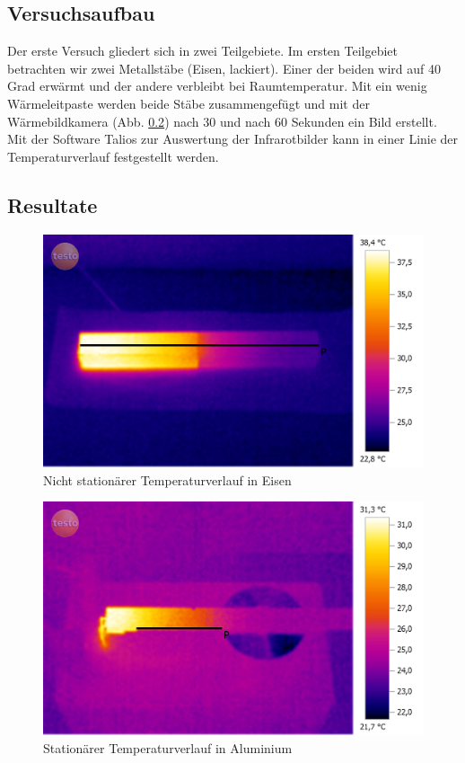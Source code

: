 \documentclass[12pt,a4paper]{article}
\begin{document}
\begin{multicols}{2}
\subsection{Versuchsaufbau}
Der erste Versuch gliedert sich in zwei Teilgebiete. Im ersten Teilgebiet betrachten wir zwei Metallstäbe (Eisen, lackiert). Einer der beiden wird auf 40 Grad erwärmt und der andere verbleibt bei Raumtemperatur. Mit ein wenig Wärmeleitpaste werden beide Stäbe zusammengefügt und mit der Wärmebildkamera (Abb. \ref{}) nach 30 und nach 60 Sekunden ein Bild erstellt.\\
Mit der Software Talios zur Auswertung der Infrarotbilder kann in einer Linie der Temperaturverlauf festgestellt werden.


\subsection{Resultate}

\begin{figure}[H]
	\centering
	\includegraphics[scale=0.12]{./BilderCorrect/Versuch_1_gradient_60.png}
	\caption{Nicht stationärer Temperaturverlauf in Eisen}
	\label{fig:nicht_stat_verlauf}
\end{figure}

\begin{figure}[H]
	\centering
	\includegraphics[scale=0.12]{./BilderCorrect/Versuch_1_stationaer_roh.png}
	\caption{Stationärer Temperaturverlauf in Aluminium}
	\label{fig:stat_verlauf}
\end{figure}




\end{multicols}
\end{document}
